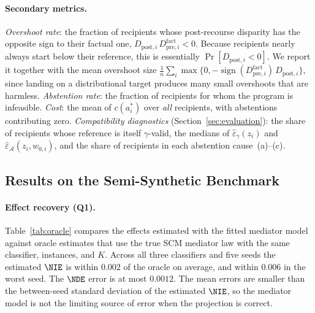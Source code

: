 \paragraph{Secondary metrics.}
\emph{Overshoot rate}: the fraction of recipients whose post-recourse
disparity has the opposite sign to their factual one,
$D_{\mathrm{post},i}\,D^{\mathrm{fact}}_{\mathrm{pre},i}<0$. Because
recipients nearly always start below their reference, this is essentially
$\Pr[D_{\mathrm{post},i}<0]$. We report it together with the mean overshoot
size $\frac1n\sum_i\max\{0,-\operatorname{sign}(D^{\mathrm{fact}}_{\mathrm{pre},i})\,D_{\mathrm{post},i}\}$,
since landing on a distributional target produces many small overshoots that
are harmless.
\emph{Abstention rate}: the fraction of recipients for whom the program is
infeasible.
\emph{Cost}: the mean of $c(a^*_i)$ over \emph{all} recipients, with
abstentions contributing zero.
\emph{Compatibility diagnostics} (Section~\ref{sec:evaluation}): the share of
recipients whose reference is itself $\gamma$-valid, the medians of
$\hat\varepsilon_\gamma(z_i)$ and $\hat\varepsilon_{\mathcal A}(z_i,w_{0,i})$,
and the share of recipients in each abstention cause~(a)--(c).

\subsection{Results on the Semi-Synthetic Benchmark}
\label{sec:exp_synth}

\paragraph{Effect recovery (Q1).}
Table~\ref{tab:oracle} compares the effects estimated with the fitted mediator
model against oracle estimates that use the true SCM mediator law with the
same classifier, instances, and $K$. Across all three classifiers and five
seeds the estimated $\NIE$ is within $0.002$ of the oracle on average, and
within $0.006$ in the worst seed. The $\NDE$ error is at most $0.0012$.
The mean errors are smaller than the between-seed standard deviation of the
estimated $\NIE$, so the mediator model is not the limiting source of error
when the projection is correct.

